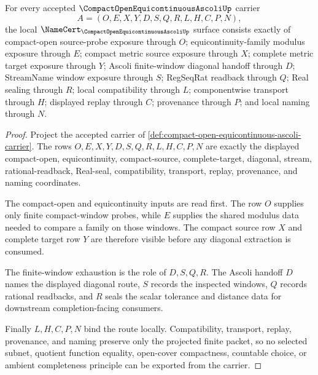 \begin{theorem}
\label{thm:compact-open-equicontinuous-ascoli-namecert-obligations}
For every accepted $\CompactOpenEquicontinuousAscoliUp$ carrier
$$
A=(O,E,X,Y,D,S,Q,R,L,H,C,P,N),
$$
the local $\NameCert_{\CompactOpenEquicontinuousAscoliUp}$ surface consists exactly of compact-open source-probe exposure through $O$; equicontinuity-family modulus exposure through $E$; compact metric source exposure through $X$; complete metric target exposure through $Y$; Ascoli finite-window diagonal handoff through $D$; StreamName window exposure through $S$; RegSeqRat readback through $Q$; Real sealing through $R$; local compatibility through $L$; componentwise transport through $H$; displayed replay through $C$; provenance through $P$; and local naming through $N$.
\end{theorem}
\begin{proof}
Project the accepted carrier of \autoref{def:compact-open-equicontinuous-ascoli-carrier}. The rows $O,E,X,Y,D,S,Q,R,L,H,C,P,N$ are exactly the displayed compact-open, equicontinuity, compact-source, complete-target, diagonal, stream, rational-readback, Real-seal, compatibility, transport, replay, provenance, and naming coordinates.

The compact-open and equicontinuity inputs are read first. The row $O$ supplies only finite compact-window probes, while $E$ supplies the shared modulus data needed to compare a family on those windows. The compact source row $X$ and complete target row $Y$ are therefore visible before any diagonal extraction is consumed.

The finite-window exhaustion is the role of $D,S,Q,R$. The Ascoli handoff $D$ names the displayed diagonal route, $S$ records the inspected windows, $Q$ records rational readbacks, and $R$ seals the scalar tolerance and distance data for downstream completion-facing consumers.

Finally $L,H,C,P,N$ bind the route locally. Compatibility, transport, replay, provenance, and naming preserve only the projected finite packet, so no selected subnet, quotient function equality, open-cover compactness, countable choice, or ambient completeness principle can be exported from the carrier.
\end{proof}



